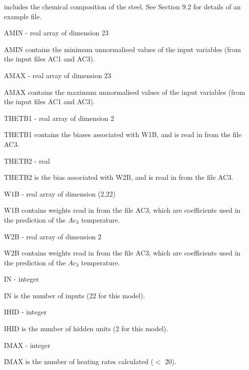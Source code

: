 includes the chemical \indent composition of the steel. See Section 9.2 for details
of an example file.
\medskip
\item {} AMIN - real array of dimension 23
\item {} \indent AMIN contains the minimum unnormalised values of the input
variables (from the \indent input files AC1 and AC3).
\medskip
\item {} AMAX - real array of dimension 23
\item {} \indent AMAX contains the maximum unnormalised values of the input 
variables (from the \indent input files AC1 and AC3).
\medskip
\item {} THETB1 - real array of dimension 2
\item {} \indent THETB1 contains the biases associated with W1B, and is read
in from the file AC3.
\medskip
\item {} THETB2 - real 
\item {} \indent THETB2 is the bias associated with W2B, and is read in from 
the file AC3.
\medskip
\item {} W1B - real array of dimension (2,22)
\item {} \indent W1B contains weights read in from the file AC3, which are
coefficients used in the \indent  prediction of the $Ac_3$ temperature.
\medskip
\item {} W2B - real array of dimension 2
\item {} \indent W2B contains weights read in from the file AC3, which are
coefficients used in the \indent prediction of the $Ac_3$ temperature.
\medskip
\item {} IN - integer
\item {} \indent IN is the number of inputs (22 for this model).
\medskip
\item {} IHID - integer
\item {} \indent IHID is the number of hidden units (2 for this model).
\medskip
\item {} IMAX - integer
\item {} \indent IMAX is the number of heating rates calculated ($<$ 20).

